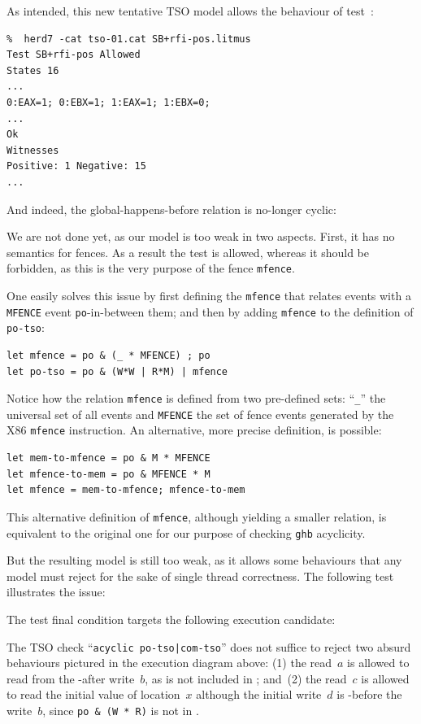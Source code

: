 As intended, this new tentative TSO model allows the behaviour of test~:
\begin{verbatim}
%  herd7 -cat tso-01.cat SB+rfi-pos.litmus
Test SB+rfi-pos Allowed
States 16
...
0:EAX=1; 0:EBX=1; 1:EAX=1; 1:EBX=0;
...
Ok
Witnesses
Positive: 1 Negative: 15
...
\end{verbatim}
And indeed, the global-happens-before relation is no-longer cyclic:
\begin{center}\end{center}


We are not done yet, as our model is too weak in two aspects.
First, it has no semantics for fences.
As a result the test  is allowed, whereas it should
be forbidden, as this is the very purpose of the fence \texttt{mfence}.
\begin{center}\end{center}
One easily solves this issue by first defining the \verb+mfence+
that relates events with a \verb+MFENCE+ event \texttt{po}-in-between them;
and then by adding \verb+mfence+ to the definition of \verb+po-tso+:
\begin{verbatim}
let mfence = po & (_ * MFENCE) ; po
let po-tso = po & (W*W | R*M) | mfence
\end{verbatim}
Notice how the relation \verb+mfence+ is defined from two pre-defined sets:
``\verb+_+'' the universal set of all events and \verb+MFENCE+ the set
of fence events generated by the X86 \texttt{mfence} instruction.
An alternative, more precise definition, is possible:
\begin{verbatim}
let mem-to-mfence = po & M * MFENCE
let mfence-to-mem = po & MFENCE * M
let mfence = mem-to-mfence; mfence-to-mem
\end{verbatim}
This alternative definition of \texttt{mfence},
although yielding a smaller relation, is equivalent to the original one
for our purpose of checking \texttt{ghb} acyclicity.

But the resulting model is still too weak,
as it allows some behaviours that any model must
reject for the sake of single thread correctness.
The following test  illustrates the issue:

The test final condition targets the following execution candidate:
\begin{center}\end{center}
The TSO check ``\verb+acyclic po-tso|com-tso+'' does not suffice to reject
two absurd behaviours pictured in the execution diagram above:
(1) the read~$a$ is allowed to
read from the -after write~$b$, as  is not included
in ; and~(2)
the read~$c$ is allowed to read the initial value of location~$x$
although the initial write~$d$ is -before the write~$b$,
since \verb+po & (W * R)+ is not in .

